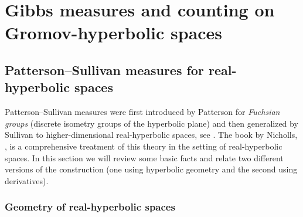 \documentclass[12pt]{amsbook}%
\makeatletter
\def\paragraph{\@startsection{paragraph}{4}%
  \z@\z@{-\fontdimen2\font}%
  {\normalfont\bfseries}}
\theoremstyle{definition}
\theoremstyle{remark}
\numberwithin{section}{chapter}
\numberwithin{subsection}{section}
\numberwithin{figure}{chapter}
\makeatother
\begin{document}
{{  %



 


\chapter{Gibbs measures and counting on Gromov-hyperbolic spaces}\label{sec:counting}



\section{Patterson--Sullivan measures for real-hyperbolic spaces} 

Patterson--Sullivan measures were first introduced by Patterson for {\em Fuchsian groups} (discrete isometry groups of the hyperbolic plane) and then generalized by Sullivan to higher-dimensional real-hyperbolic spaces, see \cite{Patterson, sullivan_density}. The book by Nicholls, \cite{nicholls}, is a comprehensive treatment of this theory in the setting of real-hyperbolic spaces. In this section we will review some basic facts and relate two different versions of the construction (one using hyperbolic geometry and the second using derivatives).   


\subsection{Geometry of real-hyperbolic spaces} 

}}
\end{document}
